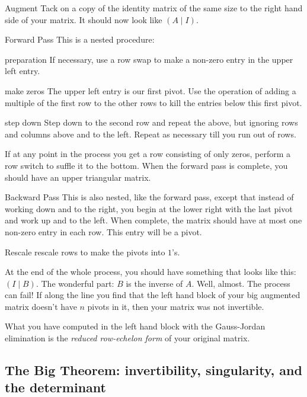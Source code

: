 \documentclass[11pt]{amsart}
\theoremstyle{definition}
\begin{document}
\begin{compactdesc}
\item[Augment] Tack on a copy of the identity matrix of the same size to the right hand side of your matrix. It should now look like $(A \mid I)$.

\item[Forward Pass] This is a nested procedure:
\begin{compactdesc}
\item[preparation] If necessary, use a row swap to make a non-zero entry in the upper left entry.
\item[make zeros] The upper left entry is our first pivot. Use the operation of adding a multiple of the first row to the other rows to kill the entries below this first pivot.
\item[step down] Step down to the second row and repeat the above, but ignoring rows and columns above and to the left. Repeat as necessary till you run out of rows.
\end{compactdesc}
If at any point in the process you get a row consisting of only zeros, perform a row switch to suffle it to the bottom.
When the forward pass is complete, you should have an upper triangular matrix.

\item[Backward Pass] This is also nested, like the forward pass, except that instead of working down and to the right, you begin at the lower right with the last pivot and work up and to the left. When complete, the matrix should have at most one non-zero entry in each row. This entry will be a pivot.

\item[Rescale] rescale rows to make the pivots into $1$'s.
\end{compactdesc}

At the end of the whole process, you should have something that looks like this: $(I \mid B)$. The wonderful part: $B$ is the inverse of $A$. Well, almost. The process can fail! If along the line you find that the left hand block of your big augmented matrix doesn't have $n$ pivots in it, then your matrix was not invertible.

What you have computed in the left hand block with the Gauss-Jordan elimination is the \emph{reduced row-echelon form} of your original matrix.


\subsection{The Big Theorem: invertibility, singularity, and the determinant}
\end{document}
